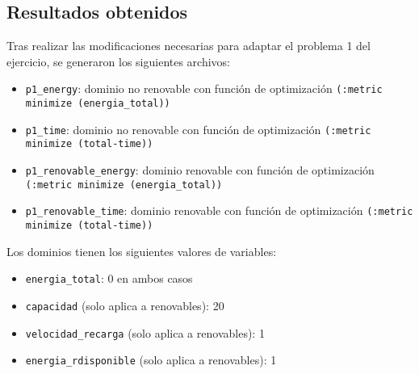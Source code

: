 \documentclass{article}
\begin{document}
\subsection{Resultados obtenidos}
Tras realizar las modificaciones necesarias para adaptar el problema 1 del ejercicio, se generaron los siguientes archivos:
\begin{itemize}
    \item \texttt{p1\_energy}: dominio no renovable con función de optimización \texttt{(:metric minimize (energia\_total))}
    \item \texttt{p1\_time}: dominio no renovable con función de optimización \texttt{(:metric minimize (total-time))}
    \item \texttt{p1\_renovable\_energy}: dominio renovable con función de optimización \texttt{(:metric minimize (energia\_total))}
    \item \texttt{p1\_renovable\_time}: dominio renovable con función de optimización \texttt{(:metric minimize (total-time))}
\end{itemize}

Los dominios tienen los siguientes valores de variables:
\begin{itemize}
    \item \texttt{energia\_total}: 0 en ambos casos
    \item \texttt{capacidad} (solo aplica a renovables): 20
    \item \texttt{velocidad\_recarga} (solo aplica a renovables): 1
    \item \texttt{energia\_rdisponible} (solo aplica a renovables): 1
\end{itemize}
\end{document}

